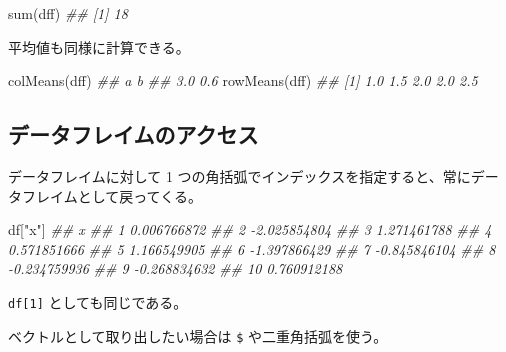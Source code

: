 \documentclass[
  letterpaper,
  xelatex,
  ja=standard, xelatex]{bxjsbook}
\newenvironment{Shaded}{\begin{snugshade}}{\end{snugshade}}
\newcommand{\DocumentationTok}[1]{\textcolor[rgb]{0.37,0.37,0.37}{\textit{#1}}}
\newcommand{\FunctionTok}[1]{\textcolor[rgb]{0.28,0.35,0.67}{#1}}
\newcommand{\NormalTok}[1]{\textcolor[rgb]{0.00,0.23,0.31}{#1}}
\newcommand{\SpecialCharTok}[1]{\textcolor[rgb]{0.37,0.37,0.37}{#1}}
\newcommand{\StringTok}[1]{\textcolor[rgb]{0.13,0.47,0.30}{#1}}
\begin{document}
\begin{Shaded}
\begin{Highlighting}[]
\FunctionTok{sum}\NormalTok{(dff)}
\DocumentationTok{\#\# [1] 18}
\end{Highlighting}
\end{Shaded}

平均値も同様に計算できる。

\begin{Shaded}
\begin{Highlighting}[]
\FunctionTok{colMeans}\NormalTok{(dff)}
\DocumentationTok{\#\#   a   b }
\DocumentationTok{\#\# 3.0 0.6}
\FunctionTok{rowMeans}\NormalTok{(dff)}
\DocumentationTok{\#\# [1] 1.0 1.5 2.0 2.0 2.5}
\end{Highlighting}
\end{Shaded}

\subsection{データフレイムのアクセス}\label{ux30c7ux30fcux30bfux30d5ux30ecux30a4ux30e0ux306eux30a2ux30afux30bbux30b9}

データフレイムに対して 1
つの角括弧でインデックスを指定すると、常にデータフレイムとして戻ってくる。

\begin{Shaded}
\begin{Highlighting}[]
\NormalTok{df[}\StringTok{"x"}\NormalTok{]}
\DocumentationTok{\#\#               x}
\DocumentationTok{\#\# 1   0.006766872}
\DocumentationTok{\#\# 2  {-}2.025854804}
\DocumentationTok{\#\# 3   1.271461788}
\DocumentationTok{\#\# 4   0.571851666}
\DocumentationTok{\#\# 5   1.166549905}
\DocumentationTok{\#\# 6  {-}1.397866429}
\DocumentationTok{\#\# 7  {-}0.845846104}
\DocumentationTok{\#\# 8  {-}0.234759936}
\DocumentationTok{\#\# 9  {-}0.268834632}
\DocumentationTok{\#\# 10  0.760912188}
\end{Highlighting}
\end{Shaded}

\texttt{df{[}1{]}} としても同じである。

ベクトルとして取り出したい場合は \texttt{\$} や二重角括弧を使う。

\begin{Shaded}
\end{Shaded}
\end{document}
